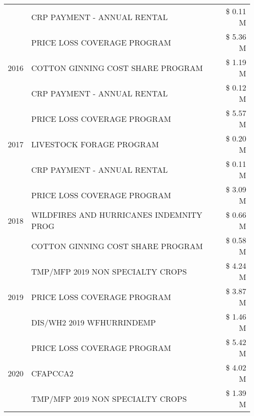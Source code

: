 \begin{tabular}{llr}
 & CRP PAYMENT - ANNUAL RENTAL & \$ 0.11 M \\
\cline{1-3}
\multirow[t]{3}{*}{2016} & PRICE LOSS COVERAGE PROGRAM                   & \$ 5.36 M \\
 & COTTON GINNING COST SHARE PROGRAM             & \$ 1.19 M \\
 & CRP PAYMENT - ANNUAL RENTAL                   & \$ 0.12 M \\
\cline{1-3}
\multirow[t]{3}{*}{2017} & PRICE LOSS COVERAGE PROGRAM & \$ 5.57 M \\
 & LIVESTOCK FORAGE PROGRAM & \$ 0.20 M \\
 & CRP PAYMENT - ANNUAL RENTAL & \$ 0.11 M \\
\cline{1-3}
\multirow[t]{3}{*}{2018} & PRICE LOSS COVERAGE PROGRAM & \$ 3.09 M \\
 & WILDFIRES AND HURRICANES INDEMNITY PROG & \$ 0.66 M \\
 & COTTON GINNING COST SHARE PROGRAM & \$ 0.58 M \\
\cline{1-3}
\multirow[t]{3}{*}{2019} & TMP/MFP 2019 NON SPECIALTY CROPS & \$ 4.24 M \\
 & PRICE LOSS COVERAGE PROGRAM & \$ 3.87 M \\
 & DIS/WH2 2019 WFHURRINDEMP & \$ 1.46 M \\
\cline{1-3}
\multirow[t]{3}{*}{2020} & PRICE LOSS COVERAGE PROGRAM & \$ 5.42 M \\
 & CFAPCCA2 & \$ 4.02 M \\
 & TMP/MFP 2019 NON SPECIALTY CROPS & \$ 1.39 M \\
\cline{1-3}
\bottomrule
\end{tabular}
